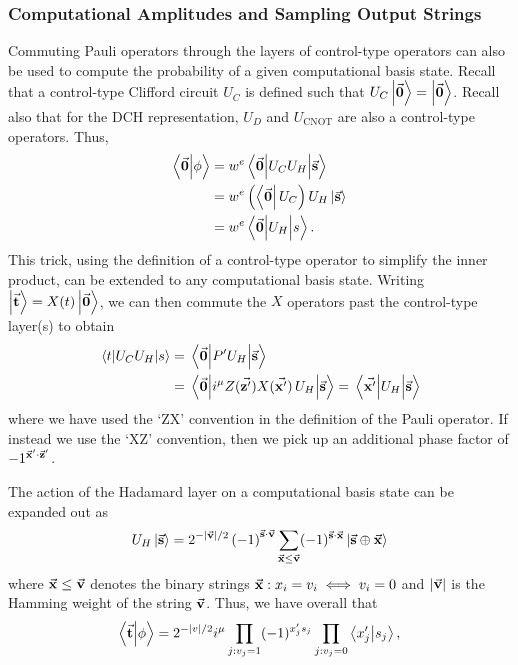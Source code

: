 \subsubsection{Computational Amplitudes and Sampling Output Strings}
Commuting Pauli operators through the layers of control-type operators can also be used to compute the probability of a given computational basis state. Recall that a control-type Clifford circuit $U_{C}$ is defined such that $U_{C}\ket{\va{0}}=\ket{\va{0}}$. Recall also that for the DCH representation, $U_{D}$ and $U_{\text{CNOT}}$ are also a control-type operators. Thus,
\begin{align*}
\braket{\va{0}}{\phi} &= w^{e}\matrixel{\va{0}}{U_{C}U_{H}}{\va{s}} \nonumber \\
&= w^{e}\left(\bra{\va{0}}U_{C}\right)U_{H}\ket{\va{s}} \nonumber \\
&= w^{e}\matrixel{\va{0}}{U_{H}}{s}.
\end{align*}
This trick, using the definition of a control-type operator to simplify the inner product, can be extended to any computational basis state. Writing $\ket{\va{t}}=X(t)\ket{\va{0}}$, we can then commute the $X$ operators past the control-type layer(s) to obtain
\begin{align}
\matrixel{t}{U_{C}U_{H}}{s} &= \matrixel{\va{0}}{P'U_{H}}{\va{s}} \nonumber \\
&= \matrixel{\va{0}}{i^{\mu}Z(\va{z'})X(\va{x'})\,U_{H}}{\va{s}} = \matrixel{\va{x'}}{U_{H}}{\va{s}}
\label{eq:arbitray_computational}
\end{align}
where we have used the `ZX' convention in the definition of the Pauli operator. If instead we use the `XZ' convention, then we pick up an additional phase factor of $-1^{\va{x}'\cdot \va{z}'}$.\par
The action of the Hadamard layer on a computational basis state can be expanded out as
\begin{equation}
U_{H}\ket{\va{s}}=2^{-\left\vert \va{v}\right\vert/2}\left(-1\right)^{\va{s}\cdot \va{v}}\sum_{\va{x}\leq \va{v}}(-1)^{\va{s}\cdot \va{x}}\ket{\va{s} \oplus \va{x}}
\label{eq:hadamard_action}
\end{equation}
where $\va{x}\leq \va{v}$ denotes the binary strings $\va{x}:x_{i}=v_{i}\iff v_{i}=0$ and $\left\vert \va{v}\right\vert$ is the Hamming weight of the string $\va{v}$. Thus, we have overall that
\begin{equation}
\braket{\va{t}}{\phi} = 2^{-\left\vert{v}\right\vert /2}i^{\mu}\prod_{j:v_{j}=1}(-1)^{x'_{j}s_{j}}\prod_{j:v_{j}=0}\braket{x'_{j}}{s_{j}},
\end{equation}
